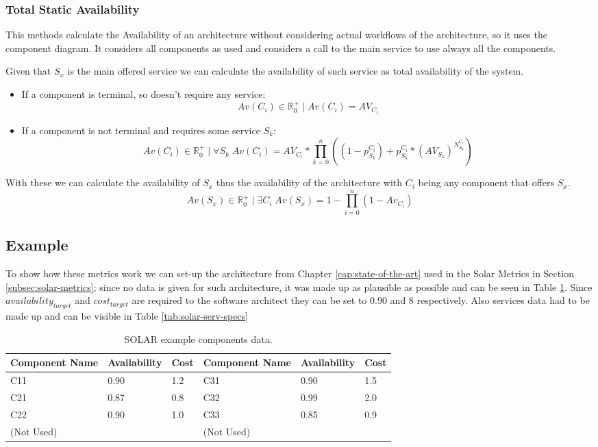 \subsubsection{Total Static Availability}
This methods calculate the Availability of an architecture without considering actual workflows of the architecture, so it uses the component diagram. It considers all components as used and considers a call to the main service to use always all the components.

Given that $S_x$ is the main offered service we can calculate the availability of such service as total availability of the system.
\begin{itemize}
\item If a component is terminal, so doesn't require any service:
\[ Av(C_{i}) \in \mathbb{R}^+_0 \; | \; Av(C_{i}) = AV_{C_{i}} \]
\item  If a component is not terminal and requires some service $S_k$:
\[ Av(C_{i}) \in \mathbb{R}^+_0 \; | \; \forall S_k \; Av(C_{i}) = AV_{C_{i}}*\prod_{k=0}^{n} ((1-p_{S_k}^{C_{i}}) + p_{S_k}^{C_{i}} * (AV_{S_k})^{N_{S_k}^{C_i}}) \]
\end{itemize}
With these we can calculate the availability of $S_x$ thus the availability of the architecture with $C_i$ being any component that offers $S_x$.
\[ Av(S_x) \in \mathbb{R}^+_0 \; | \; \exists C_i \; Av(S_x) = 1-\prod_{i=0}^{n}(1-Av_{C_i}) \]


\subsection{Example}
To show how these metrics work we can set-up the architecture from Chapter \ref{cap:state-of-the-art} used in the Solar Metrics in Section \ref{subsec:solar-metrics}; since no data is given for such architecture, it was made up as plausible as possible and can be seen in Table \ref{tab:solar-comp-specs}. Since $availability_{target}$ and $cost_{target}$ are required to the software architect they can be set to $0.90$ and $8$ respectively. Also services data had to be made up and can be visible in Table \ref{tab:solar-serv-specs}

\begin{table}[ht!b]
	\centering
	\begin{tabular}{|p{2cm}|p{2cm}|p{1cm}||p{2cm}|p{2cm}|p{1cm}|}
		\hline 
		\textbf{Component Name} & \textbf{Availability} & \textbf{Cost} & \textbf{Component Name} & \textbf{Availability} & \textbf{Cost} \\ 
		\hline 
		C11 & 0.90 & 1.2 & C31 & 0.90 & 1.5 \\
		\hline 
		C21 & 0.87 & 0.8 & C32 & 0.99 & 2.0 \\ 
		\hline 
		C22 & \multirow{2}{*}{0.90} & \multirow{2}{*}{1.0} & C33 & \multirow{2}{*}{0.85} & \multirow{2}{*}{0.9} \\ 
		(Not Used) & & & (Not Used) & & \\
		\hline 
	\end{tabular} 
	\caption[SOLAR Components data]{SOLAR example components data.}
	\label{tab:solar-comp-specs}
\end{table}

